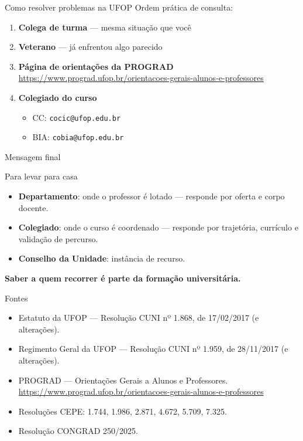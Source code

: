 \documentclass[aspectratio=169]{beamer}
\newcommand{\impt}[1]{\textcolor{maccent}{\textbf{#1}}}
\newcommand{\ntc}[1]{\textcolor{mprimary}{#1}}
\begin{document}
\begin{frame}{Como resolver problemas na UFOP}
  Ordem prática de consulta:
  \begin{enumerate}
    \item \impt{Colega de turma} --- mesma situação que você
    \item \impt{Veterano} --- já enfrentou algo parecido
    \item \impt{Página de orientações da PROGRAD} \\
          \ntc{\small\url{https://www.prograd.ufop.br/orientacoes-gerais-alunos-e-professores}}
    \item \impt{Colegiado do curso}
          \begin{itemize}
            \item CC: \ntc{\texttt{cocic@ufop.edu.br}}
            \item BIA: \ntc{\texttt{cobia@ufop.edu.br}}
          \end{itemize}
  \end{enumerate}
\end{frame}

\begin{frame}{Mensagem final}
  \begin{block}{Para levar para casa}
    \begin{itemize}
      \item \impt{Departamento}: onde o professor é lotado --- responde por oferta e corpo docente.
      \item \impt{Colegiado}: onde o curso é coordenado --- responde por trajetória, currículo e validação de percurso.
      \item \impt{Conselho da Unidade}: instância de recurso.
    \end{itemize}
  \end{block}

  \vspace{0.5cm}
  \begin{center}
    \large \impt{Saber a quem recorrer é parte da formação universitária.}
  \end{center}
\end{frame}

\begin{frame}{Fontes}
  \footnotesize
  \begin{itemize}
    \item Estatuto da UFOP --- Resolução CUNI nº 1.868, de 17/02/2017 (e alterações).
    \item Regimento Geral da UFOP --- Resolução CUNI nº 1.959, de 28/11/2017 (e alterações).
    \item PROGRAD --- Orientações Gerais a Alunos e Professores. \\
          \ntc{\url{https://www.prograd.ufop.br/orientacoes-gerais-alunos-e-professores}}
    \item Resoluções CEPE: 1.744, 1.986, 2.871, 4.672, 5.709, 7.325.
    \item Resolução CONGRAD 250/2025.
  \end{itemize}
\end{frame}
\end{document}
